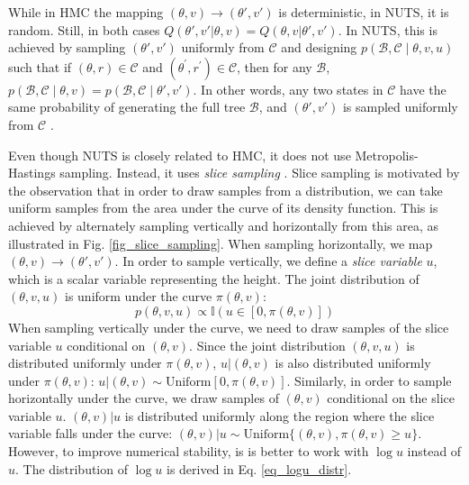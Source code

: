 \documentclass[12pt]{article}
\begin{document}
While in HMC the mapping $(\theta, v) \rightarrow (\theta', v')$ is deterministic, in NUTS, it is random. Still, in both cases $Q(\theta', v'|\theta, v) = Q(\theta, v|\theta', v')$. In NUTS, this is achieved by sampling $(\theta', v')$ uniformly from $\mathcal{C}$ and designing $p(\mathcal{B}, \mathcal{C} \mid \theta, v, u)$ such that if $(\theta, r) \in \mathcal{C}$ and $\left(\theta^{\prime}, r^{\prime}\right) \in \mathcal{C}$, then for any $\mathcal{B}$, $p(\mathcal{B}, \mathcal{C} \mid \theta, v)=p(\mathcal{B}, \mathcal{C} \mid \theta', v')$. In other words, any two states in $\mathcal{C}$ have the same probability of generating the full tree $\mathcal{B}$, and $(\theta', v')$ is sampled uniformly from $\mathcal{C}$ .

Even though NUTS is closely related to HMC, it does not use Metropolis-Hastings sampling. Instead, it uses \textit{slice sampling} \cite{slice_sampling}. Slice sampling is motivated by the observation that in order to draw samples from a distribution, we can take uniform samples from the area under the curve of its density function. This is achieved by alternately sampling vertically and horizontally from this area, as illustrated in Fig. \ref{fig_slice_sampling}. When sampling horizontally, we map $(\theta, v) \rightarrow (\theta', v')$. In order to sample vertically, we define a \textit{slice variable} $u$​, which is a scalar variable representing the height. The joint distribution of $(\theta, v, u)$ is uniform under the curve $\pi(\theta, v)$:
$$
p(\theta, v, u) \propto \mathbb{I}\left(u \in\left[0, \pi(\theta, v) \right]\right)
$$
When sampling vertically under the curve, we need to draw samples of the slice variable $u$ conditional on $(\theta, v)$. Since the joint distribution $(\theta, v, u)$ is distributed uniformly under $\pi(\theta, v)$, $u|(\theta, v)$ is also distributed uniformly under $\pi(\theta, v)$: $u|(\theta, v) \sim \text{Uniform}[0, \pi(\theta, v)]$. Similarly, in order to sample horizontally under the curve, we draw samples of $(\theta, v)$ conditional on the slice variable $u$. $(\theta, v)|u$ is distributed uniformly along the region where the slice variable falls under the curve: $(\theta, v) | u \sim \text{Uniform}\{(\theta, v), \pi(\theta, v) \geq u\}$. However, to improve numerical stability, is is better to work with $\log u$ instead of $u$. The distribution of $\log u$ is derived in Eq. \ref{eq_logu_distr}.
\end{document}
